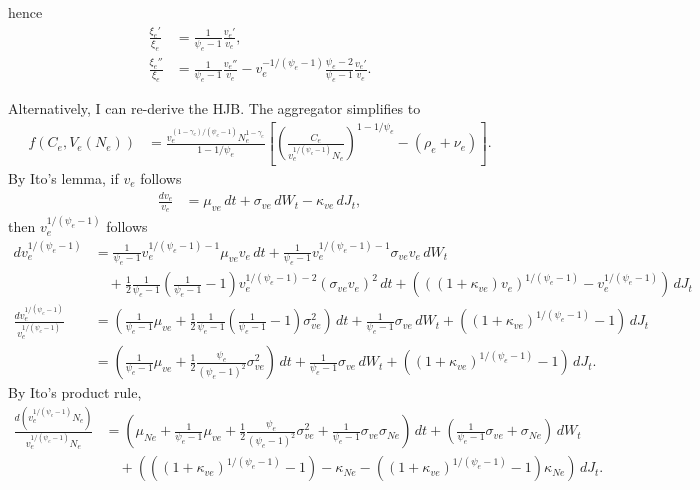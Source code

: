 \documentclass[12 pt, oneside]{article}
\theoremstyle{definition}
\theoremstyle{definition}
\theoremstyle{definition}
\newcommand{\RA}{\Rightarrow}
\begin{document}
hence %
\begin{align}\label{eq:xie derivative as function of ve}
  \frac{\xi_e'}{\xi_e} & = \frac{1}{\psi_e - 1}\frac{v_e'}{v_e},\\
\frac{\xi_e''}{\xi_e}  & =  \frac{1}{\psi_e - 1}\frac{v_e''}{v_e} - v_e^{-1 / (\psi_e - 1)} \frac{\psi_e - 2}{\psi_e - 1}\frac{v_e'}{v_e}.
\end{align}

Alternatively, I can re-derive the HJB. The aggregator simplifies to
\begin{align*}
f(C_e, V_e(N_e)) & = \frac{v_e^{(1 - \gamma_e) / (\psi_e - 1)} N_e^{ 1- \gamma_e}}{1 - 1/\psi_e}\left[\left(\frac{C_e}{v_e^{1 / (\psi_e - 1)}N_e  }\right)^{1 - 1 / \psi_e} - (\rho_e + \nu_e)\right].
\end{align*}
By Ito's lemma, if $v_e$ follows
\begin{align*}
  \frac{dv_e}{v_e} & = \mu_{ve}\, dt + \sigma_{ve}\, dW_t - \kappa_{ve}\, dJ_t,
\end{align*}
then $v_e^{1 / (\psi_e - 1)}$ follows
\begin{align*}
  dv_e^{1 / (\psi_e - 1)} & = \frac{1}{\psi_e - 1} v_e^{1 / (\psi_e - 1) - 1} \mu_{ve}v_e\, dt + \frac{1}{\psi_e - 1} v_e^{1 / (\psi_e - 1) - 1} \sigma_{ve}v_e\, dW_t\\
                                       &\quad + \frac{1}{2}\frac{1 }{\psi_e - 1}\left(\frac{1 }{\psi_e - 1} - 1\right)v_e^{1 / (\psi_e - 1) - 2}(\sigma_{ve} v_e)^2\, dt + (((1 + \kappa_{ve})v_e)^{1 / (\psi_e - 1)} - v_e^{1 / (\psi_e - 1)})\, dJ_t\\
\frac{dv_e^{1 / (\psi_e - 1)}}{v_e^{1 / (\psi_e - 1)}} & =\left( \frac{1}{\psi_e - 1}\mu_{ve}  + \frac{1}{2}\frac{1}{\psi_e - 1}\left(\frac{1}{\psi_e  - 1} - 1\right) \sigma_{ve}^2 \right)\, dt + \frac{1}{\psi_e - 1}\sigma_{ve}\, dW_t + ( (1 + \kappa_{ve})^{1 / (\psi_e - 1)} - 1)\, dJ_t\\
                          & = \left( \frac{1}{\psi_e - 1}\mu_{ve}  + \frac{1}{2}\frac{\psi_e}{(\psi_e - 1)^2} \sigma_{ve}^2 \right)\, dt + \frac{1}{\psi_e - 1}\sigma_{ve}\, dW_t + ( (1 + \kappa_{ve})^{1 / (\psi_e - 1)} - 1)\, dJ_t.
\end{align*}
By Ito's product rule,
\begin{align*}
  \frac{d(v_e^{1 / (\psi_e - 1)} N_e)}{v_e^{1 / (\psi_e - 1)} N_e} & = \left(\mu_{Ne} + \frac{1}{\psi_e - 1}\mu_{ve} + \frac{1}{2}\frac{\psi_e}{(\psi_e - 1)^2}\sigma_{ve}^2 + \frac{1}{\psi_e - 1}\sigma_{ve}\sigma_{Ne}\right)\, dt + \left(\frac{1}{\psi_e - 1}\sigma_{ve} + \sigma_{Ne}\right)\, dW_t \\
                                                                   &\quad + ( ((1 + \kappa_{ve})^{1 / (\psi_e - 1)} - 1) - \kappa_{Ne} - ((1 + \kappa_{ve})^{1 / (\psi_e - 1)} - 1)\kappa_{Ne})\, dJ_t.
\end{align*}
\end{document}
